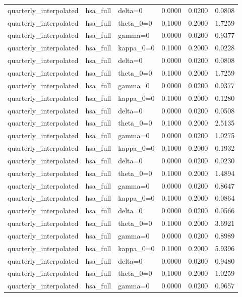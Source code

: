 \begin{tabular}{lllrrr}
quarterly\_interpolated & hsa\_full & delta=0 & 0.0000 & 0.0200 & 0.0808 \\
quarterly\_interpolated & hsa\_full & theta\_0=0 & 0.1000 & 0.2000 & 1.7259 \\
quarterly\_interpolated & hsa\_full & gamma=0 & 0.0000 & 0.0200 & 0.9377 \\
quarterly\_interpolated & hsa\_full & kappa\_0=0 & 0.1000 & 0.2000 & 0.0228 \\
quarterly\_interpolated & hsa\_full & delta=0 & 0.0000 & 0.0200 & 0.0808 \\
quarterly\_interpolated & hsa\_full & theta\_0=0 & 0.1000 & 0.2000 & 1.7259 \\
quarterly\_interpolated & hsa\_full & gamma=0 & 0.0000 & 0.0200 & 0.9377 \\
quarterly\_interpolated & hsa\_full & kappa\_0=0 & 0.1000 & 0.2000 & 0.1280 \\
quarterly\_interpolated & hsa\_full & delta=0 & 0.0000 & 0.0200 & 0.0508 \\
quarterly\_interpolated & hsa\_full & theta\_0=0 & 0.1000 & 0.2000 & 2.5135 \\
quarterly\_interpolated & hsa\_full & gamma=0 & 0.0000 & 0.0200 & 1.0275 \\
quarterly\_interpolated & hsa\_full & kappa\_0=0 & 0.1000 & 0.2000 & 0.1932 \\
quarterly\_interpolated & hsa\_full & delta=0 & 0.0000 & 0.0200 & 0.0230 \\
quarterly\_interpolated & hsa\_full & theta\_0=0 & 0.1000 & 0.2000 & 1.4894 \\
quarterly\_interpolated & hsa\_full & gamma=0 & 0.0000 & 0.0200 & 0.8647 \\
quarterly\_interpolated & hsa\_full & kappa\_0=0 & 0.1000 & 0.2000 & 0.0864 \\
quarterly\_interpolated & hsa\_full & delta=0 & 0.0000 & 0.0200 & 0.0566 \\
quarterly\_interpolated & hsa\_full & theta\_0=0 & 0.1000 & 0.2000 & 3.6921 \\
quarterly\_interpolated & hsa\_full & gamma=0 & 0.0000 & 0.0200 & 0.8989 \\
quarterly\_interpolated & hsa\_full & kappa\_0=0 & 0.1000 & 0.2000 & 5.9396 \\
quarterly\_interpolated & hsa\_full & delta=0 & 0.0000 & 0.0200 & 0.9480 \\
quarterly\_interpolated & hsa\_full & theta\_0=0 & 0.1000 & 0.2000 & 1.0259 \\
quarterly\_interpolated & hsa\_full & gamma=0 & 0.0000 & 0.0200 & 0.9657 \\

\end{tabular}

